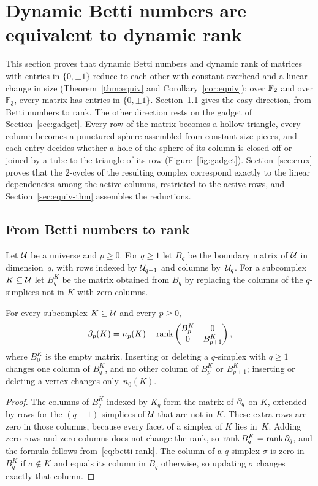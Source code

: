 \section{Dynamic Betti numbers are equivalent to dynamic rank}\label{sec:equiv}

This section proves that dynamic Betti numbers and dynamic rank of matrices with entries in $\{0,\pm1\}$ reduce to each other with constant overhead and a linear change in size (Theorem~\ref{thm:equiv} and Corollary~\ref{cor:equiv}); over $\mathbb{F}_2$ and over $\mathbb{F}_3$, every matrix has entries in $\{0,\pm1\}$.
Section~\ref{sec:b2r} gives the easy direction, from Betti numbers to rank.
The other direction rests on the gadget of Section~\ref{sec:gadget}.
Every row of the matrix becomes a hollow triangle, every column becomes a punctured sphere assembled from constant-size pieces, and each entry decides whether a hole of the sphere of its column is closed off or joined by a tube to the triangle of its row (Figure~\ref{fig:gadget}).
Section~\ref{sec:crux} proves that the $2$-cycles of the resulting complex correspond exactly to the linear dependencies among the active columns, restricted to the active rows, and Section~\ref{sec:equiv-thm} assembles the reductions.

\subsection{From Betti numbers to rank}\label{sec:b2r}

Let $\mathcal{U}$ be a universe and $p\ge0$.
For $q\ge1$ let $B_q$ be the boundary matrix of $\mathcal{U}$ in dimension~$q$, with rows indexed by $\mathcal{U}_{q-1}$ and columns by~$\mathcal{U}_q$.
For a subcomplex $K\subseteq\mathcal{U}$ let $B_q^K$ be the matrix obtained from $B_q$ by replacing the columns of the $q$-simplices not in $K$ with zero columns.

\begin{lemma}\label{lem:betti-to-rank}
For every subcomplex $K\subseteq\mathcal{U}$ and every $p\ge0$,
\[
  \beta_p(K)=n_p(K)-\operatorname{rank}\begin{pmatrix}B_p^K&0\\0&B_{p+1}^K\end{pmatrix},
\]
where $B_0^K$ is the empty matrix.
Inserting or deleting a $q$-simplex with $q\ge1$ changes one column of $B_q^K$, and no other column of $B_p^K$ or $B_{p+1}^K$; inserting or deleting a vertex changes only~$n_0(K)$.
\end{lemma}

\begin{proof}
The columns of $B_q^K$ indexed by $K_q$ form the matrix of $\partial_q$ on $K$, extended by rows for the $(q-1)$-simplices of $\mathcal{U}$ that are not in $K$.
These extra rows are zero in those columns, because every facet of a simplex of $K$ lies in~$K$.
Adding zero rows and zero columns does not change the rank, so $\operatorname{rank} B_q^K=\operatorname{rank}\partial_q$, and the formula follows from~\eqref{eq:betti-rank}.
The column of a $q$-simplex $\sigma$ is zero in $B_q^K$ if $\sigma\notin K$ and equals its column in $B_q$ otherwise, so updating $\sigma$ changes exactly that column.
\end{proof}

